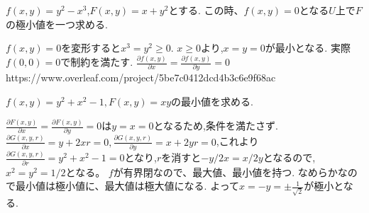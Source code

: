\begin{epl}
$f(x, y) = y^2 - x^3$,$F(x, y) = x + y^2$とする.
この時、$f(x, y) = 0$となる$U$上で$F$の極小値を一つ求める.
\end{epl}

$f(x, y)  = 0$を変形すると$x^3 = y^2 \ge 0$.
$x \ge 0$より,$x = y =0$が最小となる.
実際$f(0, 0) = 0$で制約を満たす.
$\frac{\partial f(x, y)}{\partial x} = \frac{\partial f(x, y)}{\partial y} = 0$
https://www.overleaf.com/project/5be7c0412dcd4b3c6e9f68ac
\begin{epl}
$f(x, y) = y^2 + x^2 - 1, F(x, y) = xy$の最小値を求める.
\end{epl}
$\frac{\partial F(x, y)}{\partial x} = \frac{\partial F(x, y)}{\partial y} = 0$は$y = x =0$となるため,条件を満たさず.
$\frac{\partial G(x, y, r)}{\partial x} = y + 2xr = 0, \frac{\partial G(x, y, r)}{\partial y} = x + 2yr = 0$,これより$\frac{\partial G(x, y, r)}{\partial r} = y^2 + x^2 - 1 = 0$となり,$r$を消すと$- y /2x = x/ 2y$となるので,$x^2 = y^2 = 1/2$となる。
$f$が有界閉なので、最大値、最小値を持つ.
なめらかなので最小値は極小値に、最大値は極大値になる.
よって$x = - y = \pm \frac{1}{\sqrt{2}}$が極小となる.
